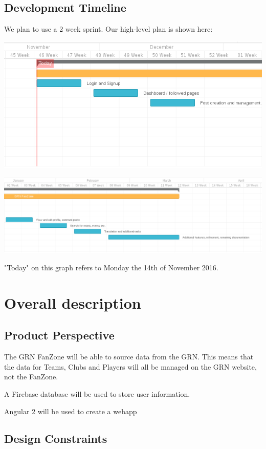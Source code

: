 \documentclass[10pt,a4paper]{article}
\begin{document}
\newpage

\subsection{Development Timeline}

We plan to use a 2 week sprint. Our high-level plan is shown here:

\includegraphics[scale=0.4]{gannt1}

\includegraphics[scale=0.3]{gannt2}

"Today" on this graph refers to Monday the 14th of November 2016.


\newpage
\section{Overall description}

\subsection{Product Perspective}
The GRN FanZone will be able to source data from the GRN. This means that the data for Teams, Clubs and Players will all be managed on the GRN website, not the FanZone. 


A Firebase database will be used to store user information.


Angular 2 will be used to create a webapp

\subsection{Design Constraints}
\end{document}

